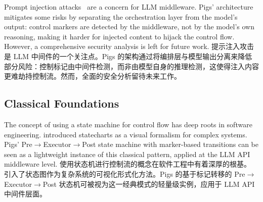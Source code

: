 Prompt injection attacks~\citep{greshake2023promptinjection, liu2024promptinjection} are a concern for LLM middleware. Pigs' architecture mitigates some risks by separating the orchestration layer from the model's output: control markers are detected by the middleware, not by the model's own reasoning, making it harder for injected content to hijack the control flow. However, a comprehensive security analysis is left for future work.
提示注入攻击~\citep{greshake2023promptinjection, liu2024promptinjection} 是 LLM 中间件的一个关注点。Pigs 的架构通过将编排层与模型输出分离来降低部分风险：控制标记由中间件检测，而非由模型自身的推理检测，这使得注入内容更难劫持控制流。然而，全面的安全分析留待未来工作。

\subsection{Classical Foundations}

The concept of using a state machine for control flow has deep roots in software engineering. \citet{harel1987statecharts} introduced statecharts as a visual formalism for complex systems. Pigs' Pre$\rightarrow$Executor$\rightarrow$Post state machine with marker-based transitions can be seen as a lightweight instance of this classical pattern, applied at the LLM API middleware level.
使用状态机进行控制流的概念在软件工程中有着深厚的根基。\citet{harel1987statecharts} 引入了状态图作为复杂系统的可视化形式化方法。Pigs 的基于标记转移的 Pre$\rightarrow$Executor$\rightarrow$Post 状态机可被视为这一经典模式的轻量级实例，应用于 LLM API 中间件层面。
